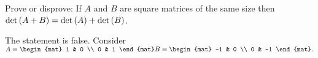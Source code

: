 
\begin{Exercise}[
name={},
title={}, 
difficulty=0,
origin={\cite{KK}}]
Prove or disprove: If $A$ and $B$ are square matrices of the same size then $\operatorname{det} \left( A+B\right) =\operatorname{det} \left( A\right) +\operatorname{det}
\left( B\right)$.
\end{Exercise}
\begin{Answer}
The statement is false.  Consider 
$A=
\begin{mat}
1 & 0 \\
0 & 1
\end{mat}
B=
\begin{mat}
-1 & 0 \\
0 & -1
\end{mat}.$
\end{Answer}

